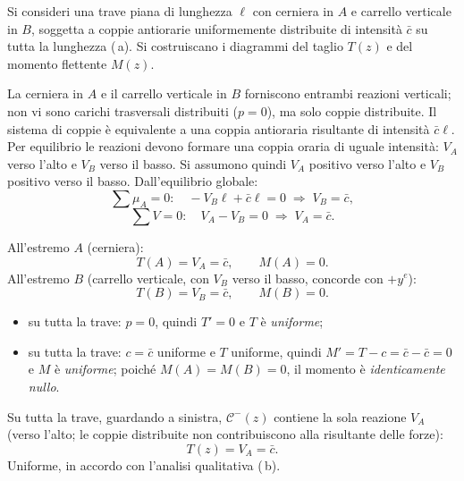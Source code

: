 \begin{esempio}
	Si consideri una trave piana di lunghezza $\ell$
	con cerniera in $A$ e carrello verticale in $B$,
	soggetta a coppie antiorarie uniformemente
	distribuite di intensità $\bar{c}$ su tutta la
	lunghezza (\,a).
	Si costruiscano i diagrammi del taglio $T(z)$
	e del momento flettente $M(z)$.
	
	\begin{svolgimento}
		



		
		
		
		La cerniera in $A$ e il carrello verticale in $B$
		forniscono entrambi reazioni verticali; non vi
		sono carichi trasversali distribuiti ($p = 0$),
		ma solo coppie distribuite.
		Il sistema di coppie è equivalente a una coppia
		antioraria risultante di intensità $\bar{c}\ell$.
		Per equilibrio le reazioni devono formare una
		coppia oraria di uguale intensità: $V_A$ verso
		l'alto e $V_B$ verso il basso.
		Si assumono quindi $V_A$ positivo verso l'alto
		e $V_B$ positivo verso il basso.
		Dall'equilibrio globale:
		\[
		\sum \mu_A = 0:\quad
		-V_B\ell + \bar{c}\ell = 0
		\;\Rightarrow\;
		V_B = \bar{c},
		\]
		\[
		\sum V = 0:\quad
		V_A - V_B = 0
		\;\Rightarrow\;
		V_A = \bar{c}.
		\]
		
		All'estremo $A$ (cerniera):
		\[
		T(A) = V_A = \bar{c}, \qquad M(A) = 0.
		\]
		All'estremo $B$ (carrello verticale, con $V_B$
		verso il basso, concorde con $+y^e$):
		\[
		T(B) = V_B = \bar{c}, \qquad M(B) = 0.
		\]
		
		\begin{itemize}[nosep]
			\item su tutta la trave: $p = 0$, quindi
			$T' = 0$ e $T$ è \emph{uniforme};
			\item su tutta la trave: $c = \bar{c}$
			uniforme e $T$ uniforme, quindi
			$M' = T - c = \bar{c} - \bar{c} = 0$
			e $M$ è \emph{uniforme}; poiché
			$M(A) = M(B) = 0$, il momento è
			\emph{identicamente nullo}.
		\end{itemize}
		
		
		Su tutta la trave, guardando a sinistra,
		$\mathcal{C}^-(z)$ contiene la sola reazione
		$V_A$ (verso l'alto; le coppie distribuite non
		contribuiscono alla risultante delle forze):
		\[
		T(z) = V_A = \bar{c}.
		\]
		Uniforme, in accordo con l'analisi qualitativa (\,b).
		

\end{svolgimento}
\end{esempio}
